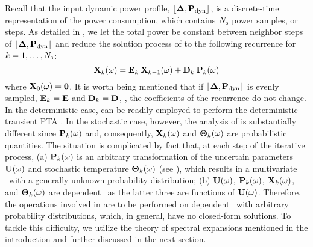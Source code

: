 Recall that the input dynamic power profile, $\profPdyn$, is a discrete-time representation of the power consumption, which contains $N_\text{s}$ power samples, or steps. As detailed in , we let the total power be constant between neighbor steps of $\profPdyn$ and reduce the solution process of  to the following recurrence for $k = 1, \dotsc, N_\text{s}$:
\begin{equation} \elabel{recurrence}
  \vX_k(\o) = \mE_k \: \vX_{k - 1}(\o) + \mD_k \: \vP_k(\o)
\end{equation}
where $\mathbf{X}_0(\omega) = \mathbf{0}$. It is worth being mentioned that if $\profPdyn$ is evenly sampled, $\mE_k = \mE$ and $\mD_k = \mD$, \ie, the coefficients of the recurrence do not change. In the deterministic case,  can be readily employed to perform the deterministic transient PTA \cite{thiele2011, ukhov2012}. In the stochastic case, however, the analysis of  is substantially different since $\mathbf{P}_k(\omega)$ and, consequently, $\mathbf{X}_k(\omega)$ and ${\boldsymbol\Theta}_k(\omega)$ are probabilistic quantities. The situation is complicated by fact that, at each step of the iterative process, (a) $\mathbf{P}_k(\omega)$ is an arbitrary transformation of the uncertain parameters $\mathbf{U}(\omega)$ and stochastic temperature ${\boldsymbol\Theta}_k(\omega)$ (see ), which results in a multivariate \rv\ with a generally unknown probability distribution; (b) $\mathbf{U}(\omega)$, $\mathbf{P}_k(\omega)$, $\mathbf{X}_k(\omega)$, and ${\boldsymbol\Theta}_k(\omega)$ are dependent \rvs\ as the latter three are functions of $\mathbf{U}(\omega)$. Therefore, the operations involved in  are to be performed on dependent \rvs\ with arbitrary probability distributions, which, in general, have no closed-form solutions. To tackle this difficulty, we utilize the theory of spectral expansions mentioned in the introduction and further discussed in the next section.

